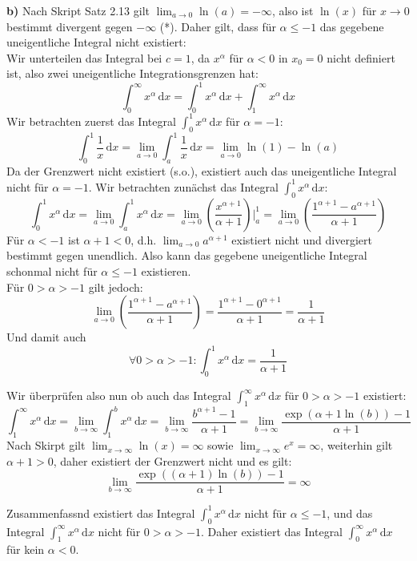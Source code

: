 \documentclass[a4paper,graphics,11pt]{article}
\begin{document}
\textbf{b)}
Nach Skript Satz 2.13 gilt $\lim_{a \to 0} \ln(a) = -\infty$, also ist $\ln(x)$ für $x\to 0$ bestimmt divergent
gegen $-\infty$ (*). Daher gilt, dass für $\alpha \leq -1$ das gegebene uneigentliche Integral nicht existiert:\\
Wir unterteilen das Integral bei $c=1$, da $x^\alpha$ für $\alpha <0$ in $x_0=0$ nicht definiert ist, also zwei
uneigentliche Integrationsgrenzen hat:
$$
	\int_{0}^{\infty} x^\alpha\, \mathrm{d}x
	= \int_{0}^{1} x^\alpha\, \mathrm{d}x + \int_{1}^{\infty} x^\alpha\, \mathrm{d}x
$$
Wir betrachten zuerst das Integral $\int_{0}^{1} x^\alpha\, \mathrm{d}x$ für $\alpha = -1$:
$$
	\int_{0}^{1} \frac{1}{x}\, \mathrm{d}x
	= \lim_{a \to 0} \int_{a}^{1} \frac{1}{x}\, \mathrm{d}x
	= \lim_{a \to 0} \ln(1)-\ln(a)
$$
Da der Grenzwert nicht existiert (s.o.), existiert auch das uneigentliche Integral nicht für $\alpha = -1$.
Wir betrachten zunächst das Integral $\int_{0}^{1} x^\alpha\, \mathrm{d}x$:
$$
	\int_{0}^{1} x^\alpha\, \mathrm{d}x
	= \lim_{a \to 0} \int_{a}^{1} x^\alpha\, \mathrm{d}x
	= \lim_{a \to 0} \left(\frac{x^{\alpha+1}}{\alpha+1}\right)\bigg|_a^1
	= \lim_{a \to 0} \left(\frac{1^{\alpha+1}-a^{\alpha+1}}{\alpha+1}\right)
$$
Für $\alpha < -1$ ist $\alpha+1 < 0$, d.h. $\lim_{a \to 0}\limits a^{\alpha+1}$ existiert nicht und
divergiert bestimmt gegen unendlich. Also kann das gegebene uneigentliche Integral schonmal
nicht für $\alpha \leq -1$ existieren.\\
Für $0 > \alpha > -1$ gilt jedoch:
$$
	\lim_{a \to 0} \left(\frac{1^{\alpha+1}-a^{\alpha+1}}{\alpha+1}\right)
	= \frac{1^{\alpha+1}-0^{\alpha+1}}{\alpha+1}
	= \frac{1}{\alpha+1}
$$
Und damit auch
$$
	\forall 0 > \alpha > -1\colon \int_{0}^{1} x^\alpha\, \mathrm{d}x = \frac{1}{\alpha+1}
$$

Wir überprüfen also nun ob auch das Integral $\int_{1}^{\infty} x^\alpha\, \mathrm{d}x$ für
$0 > \alpha > -1$ existiert:
$$
	\int_{1}^{\infty} x^\alpha\, \mathrm{d}x
	= \lim_{b \to \infty} \int_{1}^{b} x^\alpha\, \mathrm{d}x
	= \lim_{b \to \infty} \frac{b^{\alpha+1}-1}{\alpha+1}
	= \lim_{b \to \infty} \frac{\exp(\alpha+1\ln(b))-1}{\alpha+1}
$$
Nach Skirpt gilt $\lim_{x \to \infty}\limits \ln(x) = \infty$ sowie
$\lim_{x \to \infty}\limits e^x = \infty$, weiterhin gilt $\alpha+1 > 0$, daher existiert der
Grenzwert nicht und es gilt:
$$
	\lim_{b \to \infty} \frac{\exp((\alpha+1)\ln(b))-1}{\alpha+1} = \infty
$$

Zusammenfassnd existiert das Integral $\int_{0}^{1} x^\alpha\, \mathrm{d}x$ nicht für
$\alpha \leq -1$, und das Integral $\int_{1}^{\infty} x^\alpha\, \mathrm{d}x$ nicht für
$0 > \alpha >-1$. Daher existiert das Integral $\int_{0}^{\infty} x^\alpha\, \mathrm{d}x$ für
kein $\alpha < 0$.
\end{document}
